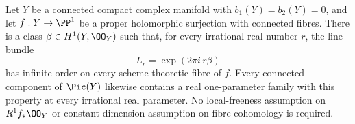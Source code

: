 \begin{proposition}\hypertarget{tag-01G7}{}\label{cdp:st:D.1.9}

Let $Y$ be a connected compact complex manifold with
$b_1(Y)=b_2(Y)=0$, and let $f:Y\to\PP^1$ be a proper
holomorphic surjection with connected fibres. There is a class
$\beta\in H^1(Y,\OO_Y)$ such that, for every irrational real number
$r$, the line bundle
\[
L_r=\exp(2\pi i\,r\beta)
\]
has infinite order on every scheme-theoretic fibre of $f$.
Every connected component of $\Pic(Y)$ likewise contains a real
one-parameter family with this property at every irrational real
parameter.
No local-freeness assumption on $R^1f_*\OO_Y$ or constant-dimension
assumption on fibre cohomology is required.
\end{proposition}


